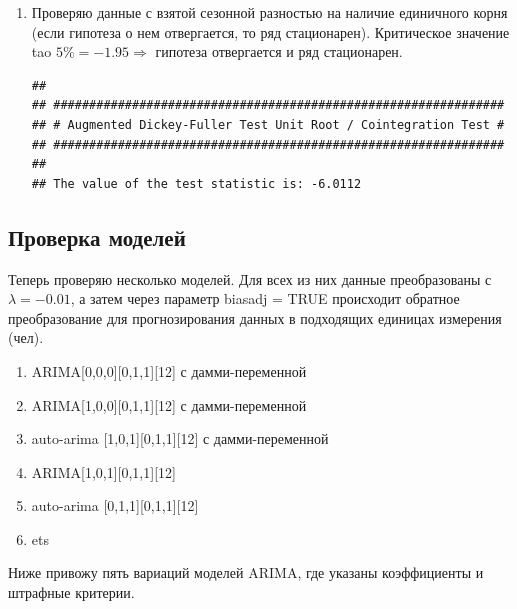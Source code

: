 \documentclass[14pt, a4paper]{extarticle}\usepackage[]{graphicx}\usepackage[]{color}
\makeatletter
\newenvironment{kframe}{%
 \def\at@end@of@kframe{}%
 \ifinner\ifhmode%
  \def\at@end@of@kframe{\end{minipage}}%
  \begin{minipage}{\columnwidth}%
 \fi\fi%
 \def\FrameCommand##1{\hskip\@totalleftmargin \hskip-\fboxsep
 \colorbox{shadecolor}{##1}\hskip-\fboxsep
     \hskip-\linewidth \hskip-\@totalleftmargin \hskip\columnwidth}%
 \MakeFramed {\advance\hsize-\width
   \@totalleftmargin\z@ \linewidth\hsize
   \@setminipage}}%
 {\par\unskip\endMakeFramed%
 \at@end@of@kframe}
\newenvironment{knitrout}{}{} %
\makeatother
\begin{document}
\begin{enumerate}
\item Проверяю данные с взятой сезонной разностью на наличие единичного корня (если гипотеза о нем отвергается, то ряд стационарен). Критическое значение tao $5 \% = - 1.95 \Rightarrow$ гипотеза отвергается и ряд стационарен. 

\begin{knitrout}
\color{fgcolor}\begin{kframe}
\begin{verbatim}
## 
## ############################################################### 
## # Augmented Dickey-Fuller Test Unit Root / Cointegration Test # 
## ############################################################### 
## 
## The value of the test statistic is: -6.0112
\end{verbatim}
\end{kframe}
\end{knitrout}
\end{enumerate}


\subsection{Проверка моделей}

Теперь проверяю несколько моделей. Для всех из них данные преобразованы с $\lambda = -0.01$, а затем через параметр biasadj = TRUE происходит обратное преобразование для прогнозирования данных в подходящих единицах измерения (чел).

\begin{enumerate}
\item ARIMA[0,0,0][0,1,1][12] с дамми-переменной 
\item ARIMA[1,0,0][0,1,1][12] с дамми-переменной 
\item auto-arima [1,0,1][0,1,1][12] с дамми-переменной 
\item ARIMA[1,0,1][0,1,1][12]  
\item auto-arima [0,1,1][0,1,1][12] 
\item ets
\end{enumerate}

Ниже привожу пять вариаций моделей ARIMA, где указаны коэффициенты и штрафные критерии.
\end{document}
